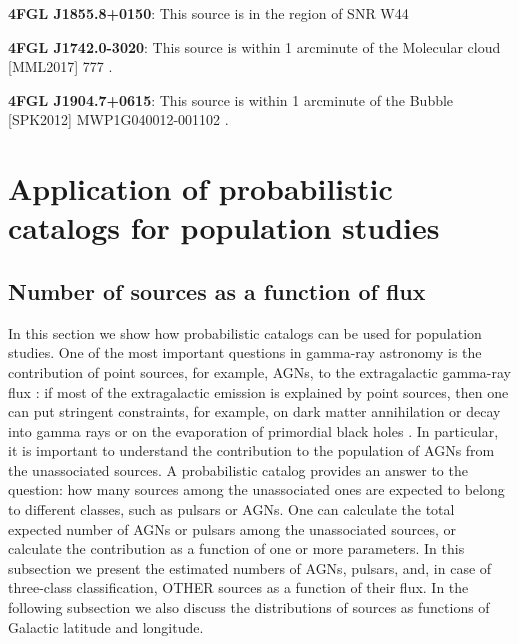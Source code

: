 \documentclass[referee]{aa} %
\newcommand{\lb}{\label}
\begin{document}
\textbf{4}\textbf{FGL J1855.8+0150}: This source is in the region of SNR W44 \citep{2020ApJ...896L..23P}

\textbf{4FGL J1742.0-3020}: This source is within 1 arcminute of the Molecular cloud [MML2017] 777 \citep{2017ApJ...834...57M}.

\textbf{4FGL J1904.7+0615}: This source is within 1 arcminute of the Bubble [SPK2012] MWP1G040012-001102 \citep{2012MNRAS.424.2442S}.


\section{Application of probabilistic catalogs for population studies}
\lb{sec:pop_studies}

\subsection{Number of sources as a function of flux}
\lb{sec:dNdS}


In this section we show how probabilistic catalogs can be used for population studies.
One of the most important questions in gamma-ray astronomy is the contribution of point sources, 
for example, AGNs, to the extragalactic gamma-ray flux 
\citep[e.g.,][]{2010ApJ...720..435A, 2011ApJ...738..181M, 2016PhRvL.116o1105A, 2016ApJS..225...18Z, 2016ApJ...826L..31Z, 2016ApJ...832..117L, 2018ApJ...856..106D}:
if most of the extragalactic emission is explained by point sources, then one can put stringent constraints, 
for example, on  dark matter annihilation or decay into gamma rays 
\citep{2015ApJ...800L..27A, 2015PhRvD..91l3001D, 2015JCAP...09..008F, 2015PhR...598....1F, 2017ChPhC..41d5104L} or 
on the evaporation of primordial black holes \citep{2010PhRvD..81j4019C}.
In particular, it is important to understand the contribution to the population of AGNs from the unassociated sources.
A probabilistic catalog provides an answer to the question: how many sources among the unassociated ones are expected to belong to different classes, such as pulsars or AGNs. 
One can calculate the total expected number of AGNs or pulsars among the unassociated sources, or calculate the contribution as a function of one or more parameters.
In this subsection we present the estimated numbers of AGNs, pulsars, and, in case of three-class classification, OTHER sources as a function of their flux.
In the following subsection we also discuss the distributions of sources as functions
of Galactic latitude and longitude.
\end{document}
